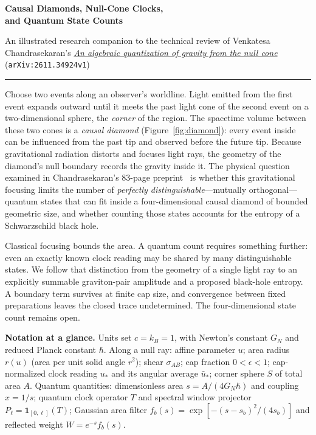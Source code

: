 \documentclass[10pt,a4paper]{article}
\newcommand{\arxiv}[2]{\href{https://arxiv.org/abs/#1}{#2}}
\newcommand{\notationstrip}[1]{%
  \par\addvspace{5pt}%
  \noindent\colorbox{mist}{%
    \parbox{\dimexpr\linewidth-2\fboxsep\relax}{%
      \footnotesize #1%
    }%
  }\par\addvspace{5pt}%
}
\begin{document}
\thispagestyle{firstpage}

{\sffamily\bfseries\fontsize{21}{24.5}\selectfont\color{ink}
Causal Diamonds, Null-Cone Clocks,\\and Quantum State Counts\par}
\vspace{3pt}
{\normalsize\color{muted}An illustrated research companion to the technical review of Venkatesa Chandrasekaran's
\arxiv{2611.34924v1}{\textsl{An algebraic quantization of gravity from the null cone}} (\texttt{arXiv:2611.34924v1})\par}
\vspace{3pt}
{\color{sea}\rule{\linewidth}{1.0pt}}
\vspace{4pt}

Choose two events along an observer's worldline. Light emitted from the first event expands outward until it meets the past light cone of the second event on a two-dimensional sphere, the \emph{corner} of the region. The spacetime volume between these two cones is a \emph{causal diamond} (Figure~\ref{fig:diamond}): every event inside can be influenced from the past tip and observed before the future tip. Because gravitational radiation distorts and focuses light rays, the geometry of the diamond's null boundary records the gravity inside it. The physical question examined in Chandrasekaran's 83-page preprint~\cite{chandrasekaran2026} is whether this gravitational focusing limits the number of \emph{perfectly distinguishable}---mutually orthogonal---quantum states that can fit inside a four-dimensional causal diamond of bounded geometric size, and whether counting those states accounts for the entropy of a Schwarzschild black hole.

Classical focusing bounds the area. A quantum count requires something further: even an exactly known clock reading may be shared by many distinguishable states. We follow that distinction from the geometry of a single light ray to an explicitly summable graviton-pair amplitude and a proposed black-hole entropy. A boundary term survives at finite cap size, and convergence between fixed preparations leaves the closed trace undetermined. The four-dimensional state count remains open.

\notationstrip{%
  \textbf{\sffamily\color{seadeep}Notation at a glance.}
  Units set $c = k_B = 1$, with Newton's constant $G_N$ and reduced Planck constant $\hbar$.
  Along a null ray: affine parameter $u$; area radius $r(u)$ (area per unit solid angle $r^2$); shear $\sigma_{AB}$; cap fraction $0<\epsilon<1$; cap-normalized clock reading $u_*$ and its angular average $\bar u_*$; corner sphere $S$ of total area $A$.
  Quantum quantities: dimensionless area $s = A/(4G_N\hbar)$ and coupling $x = 1/s$; quantum clock operator $T$ and spectral window projector $P_\ell = \mathbf{1}_{[0,\ell]}(T)$; Gaussian area filter $f_b(s)=\exp[-(s-s_b)^2/(4s_b)]$ and reflected weight $W = e^{-s}f_b(s)$.%
}
\end{document}
